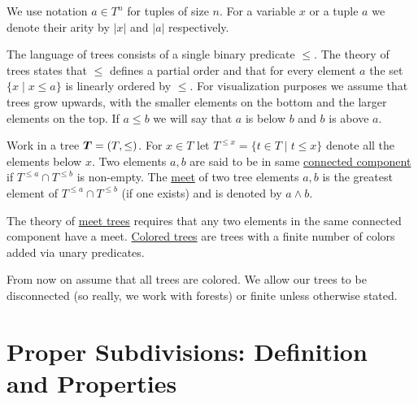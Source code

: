 \documentclass{amsart}
\DeclareMathOperator{\TT}{\boldface T}
\newcommand{\defn}{\underline}
\begin{document}
We use notation $a \in T^n$ for tuples of size $n$. For a variable $x$ or a tuple $a$ we denote their arity by $|x|$ and $|a|$ respectively.

The language of trees consists of a single binary predicate $\leq$. The theory of trees states that $\leq$ defines a partial order and that for every element $a$ the set $\{x \mid x \leq a\}$ is linearly ordered by $\leq$. For visualization purposes we assume that trees grow upwards, with the smaller elements on the bottom and the larger elements on the top. If $a \leq b$ we will say that $a$ is below $b$ and $b$ is above $a$.

\begin{Definition}
  Work in a tree $\TT = (T, \leq)$.
  For $x \in T$ let $T^{\leq x} = \{t \in T \mid t \leq x\}$ denote all the elements below $x$.
  Two elements $a,b$ are said to be in same \defn{connected component} if $T^{\leq a} \cap T^{\leq b}$ is non-empty.
  The \defn{meet} of two tree elements $a,b$ is the greatest element of $T^{\leq a} \cap T^{\leq b}$ (if one exists) and is denoted by $a \wedge b$.
\end{Definition}

The theory of \defn{meet trees} requires that any two elements in the same connected component have a meet. \defn{Colored trees} are trees with a finite number of colors added via unary predicates.

From now on assume that all trees are colored.
We allow our trees to be disconnected (so really, we work with forests) or finite unless otherwise stated.




\section{Proper Subdivisions: Definition and Properties}
\end{document}
